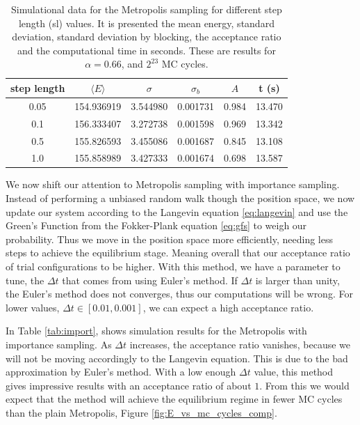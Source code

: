 \documentclass[aps,reprint,superscriptaddress,nofootinbib]{revtex4-2}
\begin{document}
    \begingroup
    \setlength{\tabcolsep}{2pt} %
    \renewcommand{\arraystretch}{1.25} %
    \begin{table}[]
        \caption{Simulational data for the Metropolis sampling for different step length (sl) values. It is presented the mean energy, standard deviation, standard deviation by blocking, the acceptance ratio and the computational time in seconds. These are results for \(\alpha = 0.66\), and \(2^{23}\) MC cycles.}
        \begin{tabular}{c||ccccc}
            step length & \(\langle E \rangle\) & \(\sigma\) & \(\sigma_b\) & \(A\) & t (s) \\ \hline \hline
            0.05 & 154.936919 & 3.544980 & 0.001731 & 0.984 & 13.470 \\
            0.1 & 156.333407 & 3.272738 & 0.001598 & 0.969 & 13.342 \\
            0.5 & 155.826593 & 3.455086 & 0.001687 & 0.845 & 13.108 \\
            1.0 & 155.858989 & 3.427333 & 0.001674 & 0.698 & 13.587 
        \end{tabular}
        \label{tab:metrop}
    \end{table}
    \endgroup

    We now shift our attention to Metropolis sampling with importance sampling. Instead of performing a unbiased random walk though the position space, we now update our system according to the Langevin equation \eqref{eq:langevin} and use the Green's Function from the Fokker-Plank equation \eqref{eq:gfs} to weigh our probability. Thus we move in the position space more efficiently, needing less steps to achieve the equilibrium stage. Meaning overall that our acceptance ratio of trial configurations to be higher. With this method, we have a parameter to tune, the \(\Delta t\) that comes from using Euler's method. If \(\Delta t\) is larger than unity, the Euler's method does not converges, thus our computations will be wrong. For lower values, \(\Delta t \in [0.01, 0.001]\), we can expect a high acceptance ratio.
    
    In Table \ref{tab:import}, shows simulation results for the Metropolis with importance sampling. As \(\Delta t\) increases, the acceptance ratio vanishes, because we will not be moving accordingly to the Langevin equation. This is due to the bad approximation by Euler's method. With a low enough \(\Delta t\) value, this method gives impressive results with an acceptance ratio of about \(1\). From this we would expect that the method will achieve the equilibrium regime in fewer MC cycles than the plain Metropolis, Figure \ref{fig:E_vs_mc_cycles_comp}.
    
\end{document}
